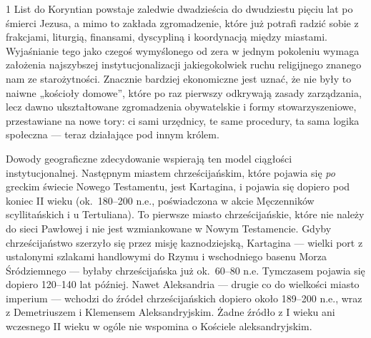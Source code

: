 1 List do Koryntian powstaje zaledwie dwadzieścia do dwudziestu pięciu lat po śmierci Jezusa, a mimo to zakłada zgromadzenie, które już potrafi radzić sobie z frakcjami, liturgią, finansami, dyscypliną i koordynacją między miastami.
Wyjaśnianie tego jako czegoś wymyślonego od zera w jednym pokoleniu wymaga założenia najszybszej instytucjonalizacji jakiegokolwiek ruchu religijnego znanego nam ze starożytności.
Znacznie bardziej ekonomiczne jest uznać, że nie były to naiwne „kościoły domowe”, które po raz pierwszy odkrywają zasady zarządzania, lecz dawno ukształtowane zgromadzenia obywatelskie i formy stowarzyszeniowe, przestawiane na nowe tory: ci sami urzędnicy, te same procedury, ta sama logika społeczna — teraz działające pod innym królem.

Dowody geograficzne zdecydowanie wspierają ten model ciągłości instytucjonalnej.
Następnym miastem chrześcijańskim, które pojawia się \emph{po} greckim świecie Nowego Testamentu, jest Kartagina, i pojawia się dopiero pod koniec II wieku (ok.~180–200 n.e., poświadczona w akcie Męczenników scyllitańskich i u Tertuliana).
To pierwsze miasto chrześcijańskie, które nie należy do sieci Pawłowej i nie jest wzmiankowane w Nowym Testamencie.
Gdyby chrześcijaństwo szerzyło się przez misję kaznodziejską, Kartagina — wielki port z ustalonymi szlakami handlowymi do Rzymu i wschodniego basenu Morza Śródziemnego — byłaby chrześcijańska już ok.~60–80 n.e.
Tymczasem pojawia się dopiero 120–140 lat później.
Nawet Aleksandria — drugie co do wielkości miasto imperium — wchodzi do źródeł chrześcijańskich dopiero około 189–200 n.e., wraz z Demetriuszem i Klemensem Aleksandryjskim.
Żadne źródło z I wieku ani wczesnego II wieku w ogóle nie wspomina o Kościele aleksandryjskim.

